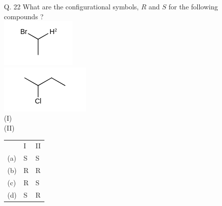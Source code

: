\documentclass[10pt]{article}
\begin{document}
Q. 22 What are the configurational symbols, $R$ and $S$ for the following compounds ?\\
\includegraphics{smile-7a25128d9e6199460f3bb9d65c28efbb07767010}\\
\includegraphics{smile-5d025816925eae543c0452879f903ca53cd4a9f0}\\
(I)\\
(II)

\begin{center}
\begin{tabular}{lll}
 & I & II \\
(a) & S & S \\
(b) & R & R \\
(c) & R & S \\
(d) & S & R \\
\end{tabular}
\end{center}
\end{document}

